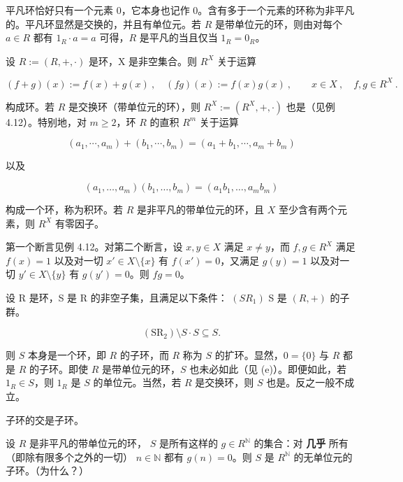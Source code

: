 \begin{example}

\begin{items}
\item

平凡环恰好只有一个元素 0，它本身也记作 0。含有多于一个元素的环称为非平凡的。平凡环显然是交换的，并且有单位元。若 $R$ 是带单位元的环，则由对每个 $a \in R$ 都有 $1_R \cdot a = a$ 可得，$R$ 是平凡的当且仅当 $1_R = 0_R$。

\item

设  $ R := (R, +, \cdot) $ 是环，X 是非空集合。则  $ R^X $ 关于运算

\[
(f+g)(x):=f(x)+g(x)~,\quad(f g)(x):=f(x)g(x)~,\qquad x\in X~,\quad f,g\in R^{X}~.
\]

构成环。若 $R$ 是交换环（带单位元的环），则 $R^X := (R^X, +, \cdot)$ 也是（见例 4.12）。特别地，对 $m \geq 2$，环 $R$ 的直积 $R^m$ 关于运算

\[
(a_{1},\cdots,a_{m})+(b_{1},\cdots,b_{m})=(a_{1}+b_{1},\cdots,a_{m}+b_{m})
\]

以及

\[
(a_{1},\ldots,a_{m})(b_{1},\ldots,b_{m})=(a_{1}b_{1},\ldots,a_{m}b_{m})
\]

构成一个环，称为积环。若 $R$ 是非平凡的带单位元的环，且 $X$ 至少含有两个元素，则 $R^X$ 有零因子。

\proofhead
第一个断言见例 4.12。对第二个断言，设  $ x, y \in X $ 满足  $ x \neq y $，而  $ f, g \in R^X $ 满足  $ f(x) = 1 $ 以及对一切  $ x' \in X \setminus \{x\} $ 有  $ f(x') = 0 $，又满足  $ g(y) = 1 $ 以及对一切  $ y' \in X \setminus \{y\} $ 有  $ g(y') = 0 $。则  $ fg = 0 $。
\item

设 R 是环，S 是 R 的非空子集，且满足以下条件：
 $ (SR_{1}) $ S 是  $ (R, +) $ 的子群。

\[
(\mathrm{S R}_{2})\setminus S\cdot S\subseteq S.
\]

则 $S$ 本身是一个环，即 $R$ 的子环，而 $R$ 称为 $S$ 的扩环。显然，$0 = \{0\}$ 与 $R$ 都是 $R$ 的子环。即使 $R$ 是带单位元的环，$S$ 也未必如此（见 (e)）。即便如此，若 $1_R \in S$，则 $1_R$ 是 $S$ 的单位元。当然，若 $R$ 是交换环，则 $S$ 也是。反之一般不成立。

\item

子环的交是子环。

\item

设  $ R $ 是非平凡的带单位元的环， $ S $ 是所有这样的  $ g \in R^{\mathbb{N}} $ 的集合：对 \textbf{几乎} 所有（即除有限多个之外的一切） $ n \in \mathbb{N} $ 都有  $ g(n) = 0 $。则  $ S $ 是  $ R^{\mathbb{N}} $ 的无单位元的子环。（为什么？）


\end{items}
\end{example}
